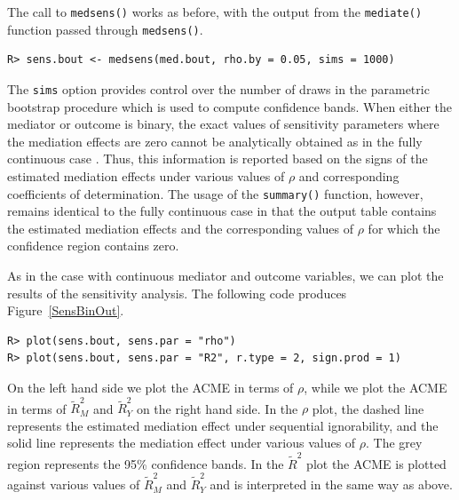 \documentclass[11pt,letterpaper]{article}
\theoremstyle{plain}
\begin{document}
The call to \texttt{medsens()} works as before, with the output from the \texttt{mediate()}
function passed through \texttt{medsens()}.
\begin{verbatim}
R> sens.bout <- medsens(med.bout, rho.by = 0.05, sims = 1000)
\end{verbatim}
The \texttt{sims} option provides control over the number of draws in
the parametric bootstrap procedure which is used to compute confidence bands. 
When either the mediator or outcome is binary, the exact values of 
sensitivity parameters where the mediation effects are zero cannot be analytically 
obtained as in the fully continuous case \citep[see][Section 4]{imai:keel:yama:10}.
Thus, this information is reported based on the signs of the estimated mediation 
effects under various values of $\rho$ and corresponding coefficients of determination.
The usage of the \texttt{summary()} function, however, remains
identical to the fully continuous case 
in that the output table contains the estimated mediation
effects and the corresponding values of $\rho$ for which the
confidence region contains zero.

As in the case with continuous mediator and outcome variables, we can plot the
results of the sensitivity analysis.  The following code produces Figure~\ref{SensBinOut}.
\begin{verbatim}
R> plot(sens.bout, sens.par = "rho")
R> plot(sens.bout, sens.par = "R2", r.type = 2, sign.prod = 1)
\end{verbatim}
On the left hand side we plot the ACME in terms of $\rho$, while we plot the ACME 
in terms of $\widetilde{R}^2_M$ and $\widetilde{R}^2_Y$ on the right hand side.
In the $\rho$ plot, the dashed line represents the estimated mediation effect
under sequential
ignorability, and the solid line represents the mediation effect under
various values of $\rho$.  The grey region represents the 95\%
confidence bands. In the $\widetilde{R}^2$ plot the ACME is plotted against various values of $\widetilde{R}^2_M$ and $\widetilde{R}^2_Y$ and is interpreted in the same way as above.
\end{document}
